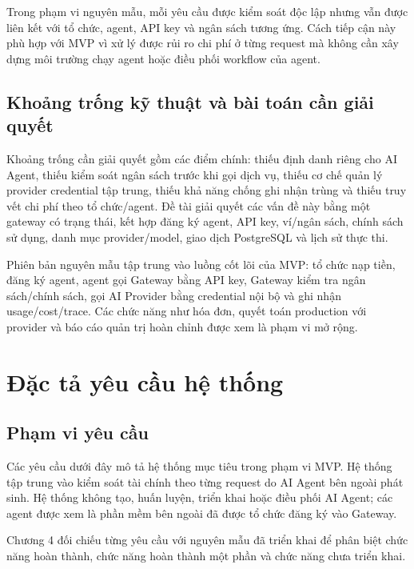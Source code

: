 Trong phạm vi nguyên mẫu, mỗi yêu cầu được kiểm soát độc lập nhưng vẫn được liên kết với tổ chức, agent, API key và ngân sách tương ứng. Cách tiếp cận này phù hợp với MVP vì xử lý được rủi ro chi phí ở từng request mà không cần xây dựng môi trường chạy agent hoặc điều phối workflow của agent.


\subsection*{Khoảng trống kỹ thuật và bài toán cần giải quyết}

Khoảng trống cần giải quyết gồm các điểm chính: thiếu định danh riêng cho AI Agent, thiếu kiểm soát ngân sách trước khi gọi dịch vụ, thiếu cơ chế quản lý provider credential tập trung, thiếu khả năng chống ghi nhận trùng và thiếu truy vết chi phí theo tổ chức/agent. Đề tài giải quyết các vấn đề này bằng một gateway có trạng thái, kết hợp đăng ký agent, API key, ví/ngân sách, chính sách sử dụng, danh mục provider/model, giao dịch PostgreSQL và lịch sử thực thi.

Phiên bản nguyên mẫu tập trung vào luồng cốt lõi của MVP: tổ chức nạp tiền, đăng ký agent, agent gọi Gateway bằng API key, Gateway kiểm tra ngân sách/chính sách, gọi AI Provider bằng credential nội bộ và ghi nhận usage/cost/trace. Các chức năng như hóa đơn, quyết toán production với provider và báo cáo quản trị hoàn chỉnh được xem là phạm vi mở rộng.

\section{Đặc tả yêu cầu hệ thống}

\subsection*{Phạm vi yêu cầu}

Các yêu cầu dưới đây mô tả hệ thống mục tiêu trong phạm vi MVP. Hệ thống tập trung vào kiểm soát tài chính theo từng request do AI Agent bên ngoài phát sinh. Hệ thống không tạo, huấn luyện, triển khai hoặc điều phối AI Agent; các agent được xem là phần mềm bên ngoài đã được tổ chức đăng ký vào Gateway.

Chương 4 đối chiếu từng yêu cầu với nguyên mẫu đã triển khai để phân biệt chức năng hoàn thành, chức năng hoàn thành một phần và chức năng chưa triển khai.

